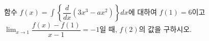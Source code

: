 함수 $f(x)=\displaystyle\int\left\{\dfrac{d}{dx}(3x^3-ax^2)\right\}dx$에 대하여 $f(1)=6$이고 $\displaystyle\lim_{x\to 1}\dfrac{f(x)-f(1)}{x-1}=-1$일 때, $f(2)$의 값을 구하시오. 
